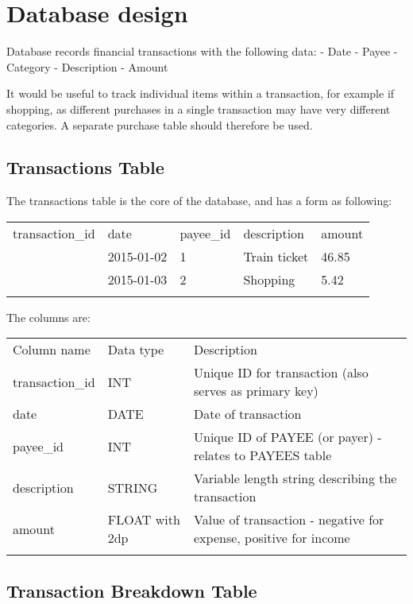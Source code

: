 \documentclass[]{article}
\begin{document}
\section{Database design}\label{database-design}

Database records financial transactions with the following data: - Date
- Payee - Category - Description - Amount

It would be useful to track individual items within a transaction, for
example if shopping, as different purchases in a single transaction may
have very different categories. A separate purchase table should
therefore be used.

\subsection{Transactions Table}\label{transactions-table}

The transactions table is the core of the database, and has a form as
following:

\begin{longtable}[c]{@{}lllll@{}}
\toprule\addlinespace
transaction\_id & date & payee\_id & description & amount
\\\addlinespace
\midrule\endhead
1 & 2015-01-02 & 1 & Train ticket & 46.85
\\\addlinespace
2 & 2015-01-03 & 2 & Shopping & 5.42
\\\addlinespace
\bottomrule
\end{longtable}

The columns are:

\begin{longtable}[c]{@{}lll@{}}
\toprule\addlinespace
Column name & Data type & Description
\\\addlinespace
\midrule\endhead
transaction\_id & INT & Unique ID for transaction (also serves as
primary key)
\\\addlinespace
date & DATE & Date of transaction
\\\addlinespace
payee\_id & INT & Unique ID of PAYEE (or payer) - relates to PAYEES
table
\\\addlinespace
description & STRING & Variable length string describing the transaction
\\\addlinespace
amount & FLOAT with 2dp & Value of transaction - negative for expense,
positive for income
\\\addlinespace
\bottomrule
\end{longtable}

\subsection{Transaction Breakdown
Table}\label{transaction-breakdown-table}
\end{document}
